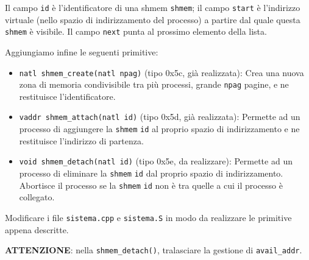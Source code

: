 Il campo \verb|id| \`e l'identificatore di una shmem \verb|shmem|; 
il campo \verb|start| \`e l'indirizzo virtuale (nello spazio di indirizzamento
del processo) a partire dal quale questa \verb|shmem| \`e visibile.
Il campo \verb|next| punta al prossimo elemento della lista.

Aggiungiamo infine le seguenti primitive:
\begin{itemize}
   \item \verb|natl shmem_create(natl npag)| (tipo 0x5c, gi\`a realizzata):
   	Crea una nuova zona di memoria condivisibile tra pi\`u processi, grande \verb|npag| pagine,
	e ne restituisce l'identificatore.
   \item \verb|vaddr shmem_attach(natl id)| (tipo 0x5d, gi\`a realizzata):
   	Permette ad un processo di aggiungere la \verb|shmem| \verb|id| al proprio spazio di indirizzamento
	e ne restituisce l'indirizzo di partenza.
   \item \verb|void shmem_detach(natl id)| (tipo 0x5e, da realizzare):
   	Permette ad un processo di eliminare la \verb|shmem| \verb|id| dal proprio
	spazio di indirizzamento. Abortisce il processo se la \verb|shmem| \verb|id|
	non \`e tra quelle a cui il processo \`e collegato.
\end{itemize}

Modificare i file \verb|sistema.cpp| e \verb|sistema.S| in modo da realizzare le primitive appena descritte.

{\bf ATTENZIONE}: nella \verb|shmem_detach()|, tralasciare la gestione di \verb|avail_addr|.
